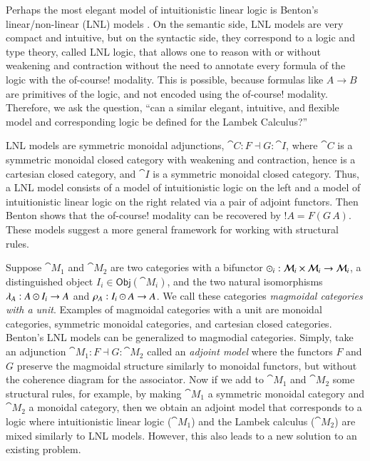 Perhaps the most elegant model of intuitionistic linear logic is
Benton's linear/non-linear (LNL) models \cite{Benton:1994}. On the
semantic side, LNL models are very compact and intuitive, but on the
syntactic side, they correspond to a logic and type theory, called LNL
logic, that allows one to reason with or without weakening and
contraction without the need to annotate every formula of the logic
with the of-course!  modality.  This is possible, because formulas
like $A \to B$ are primitives of the logic, and not encoded using the
of-course! modality.  Therefore, we ask the question, ``can a similar
elegant, intuitive, and flexible model and corresponding logic be
defined for the Lambek Calculus?''

LNL models are symmetric monoidal adjunctions, $\cat{C} : F \dashv G :
\cat{I}$, where $\cat{C}$ is a symmetric monoidal closed category with
weakening and contraction, hence is a cartesian closed category, and
$\cat{I}$ is a symmetric monoidal closed category.  Thus, a LNL model
consists of a model of intuitionistic logic on the left and a model of
intuitionistic linear logic on the right related via a pair of adjoint
functors.  Then Benton shows that the of-course! modality can be
recovered by $!A = F(G\,A)$.  These models suggest a more general
framework for working with structural rules.

Suppose $\cat{M}_1$ and $\cat{M}_2$ are two categories with a
bifunctor $\odot_i : \mathcal{M}_i \times \mathcal{M}_i \rightarrow \mathcal{M}_i$, a
distinguished object $I_i \in \mathsf{Obj}(\cat{M}_i)$, and the two
natural isomorphisms $\lambda_A : A \odot I_i \rightarrow A$ and $\rho_A :
I_i \odot A \rightarrow A$.  We call these categories \emph{magmoidal
  categories with a unit}.  Examples of magmoidal categories with a
unit are monoidal categories, symmetric monoidal categories, and
cartesian closed categories.  Benton's LNL models can be generalized
to magmodial categories.  Simply, take an adjunction $\cat{M}_1 : F
\dashv G : \cat{M}_2$ called an \emph{adjoint model} where the
functors $F$ and $G$ preserve the magmoidal structure similarly to
monoidal functors, but without the coherence diagram for the
associator.  Now if we add to $\cat{M}_1$ and $\cat{M}_2$ some
structural rules, for example, by making $\cat{M}_1$ a symmetric
monoidal category and $\cat{M}_2$ a monoidal category, then we obtain
an adjoint model that corresponds to a logic where intuitionistic
linear logic ($\cat{M}_1$) and the Lambek calculus ($\cat{M}_2$) are
mixed similarly to LNL models.  However, this also leads to a new
solution to an existing problem.

